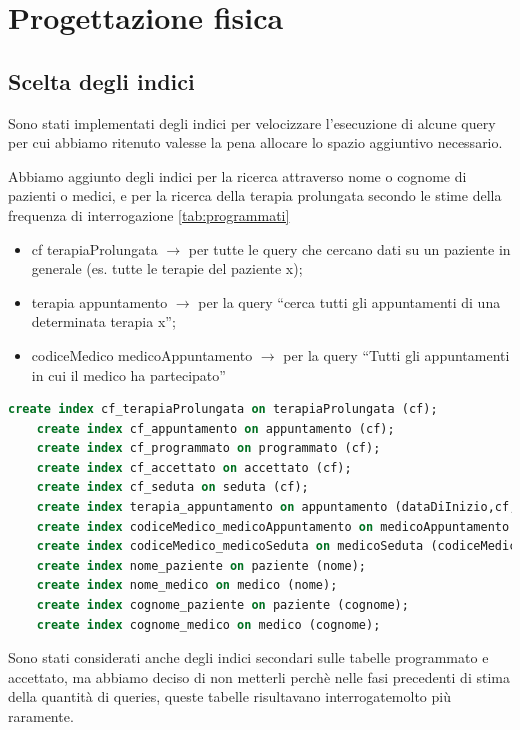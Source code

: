 \documentclass[11pt]{article}
\begin{document}
\section{Progettazione fisica}
\subsection{Scelta degli indici}
Sono stati implementati degli indici per velocizzare l'esecuzione di alcune query per cui abbiamo ritenuto valesse la pena allocare lo spazio aggiuntivo necessario.

Abbiamo aggiunto degli indici per la ricerca attraverso nome o cognome di pazienti o medici, e per la ricerca della terapia prolungata secondo le stime della frequenza di interrogazione \ref{tab:programmati}

\begin{itemize}
    \item cf terapiaProlungata $\rightarrow$ per tutte le query che cercano dati su un paziente in generale (es. tutte le terapie del paziente x);
    \item terapia appuntamento $\rightarrow$ per la query ``cerca tutti gli appuntamenti di una determinata terapia x'';
    \item codiceMedico medicoAppuntamento $\rightarrow$ per la query ``Tutti gli appuntamenti in cui il medico ha partecipato''
\end{itemize}
\begin{lstlisting}[language=SQL]
    create index cf_terapiaProlungata on terapiaProlungata (cf);
    create index cf_appuntamento on appuntamento (cf);
    create index cf_programmato on programmato (cf);
    create index cf_accettato on accettato (cf);
    create index cf_seduta on seduta (cf);
    create index terapia_appuntamento on appuntamento (dataDiInizio,cf,tipoDiSpecializzazione);
    create index codiceMedico_medicoAppuntamento on medicoAppuntamento (codiceMedico);
    create index codiceMedico_medicoSeduta on medicoSeduta (codiceMedico);
    create index nome_paziente on paziente (nome);
    create index nome_medico on medico (nome);
    create index cognome_paziente on paziente (cognome);
    create index cognome_medico on medico (cognome);
\end{lstlisting}
Sono stati considerati anche degli indici secondari sulle tabelle programmato e accettato, ma abbiamo deciso di non metterli perchè nelle fasi precedenti di stima della quantità di queries, queste tabelle risultavano interrogatemolto più raramente.
\end{document}
